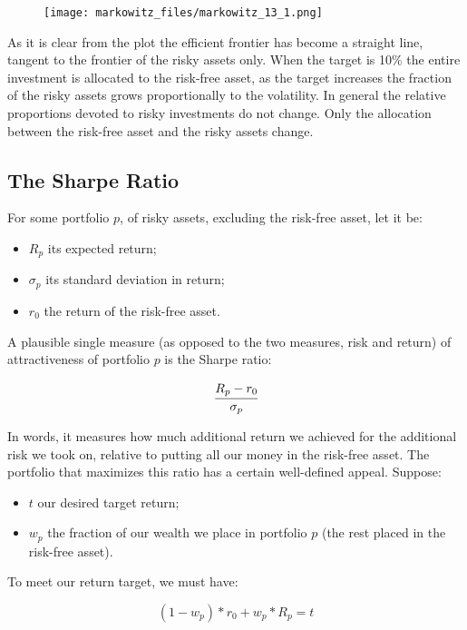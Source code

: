 \begin{figure}
\centering
    \texttt{[image: markowitz\_files/markowitz\_13\_1.png]}
    \end{figure}
    
    As it is clear from the plot the efficient frontier has become a
straight line, tangent to the frontier of the risky assets only. When
the target is 10\% the entire investment is allocated to the risk-free
asset, as the target increases the fraction of the risky assets grows
proportionally to the volatility. In general the relative proportions
devoted to risky investments do not change. Only the allocation between
the risk-free asset and the risky assets change.

\subsection{The Sharpe Ratio}\label{the-sharpe-ratio}

For some portfolio \(p\), of risky assets, excluding the risk-free
asset, let it be:

\begin{itemize}
\tightlist
\item
  \(R_p\) its expected return;
\item
  \(\sigma_p\) its standard deviation in return;
\item
  \(r_0\) the return of the risk-free asset.
\end{itemize}

A plausible single measure (as opposed to the two measures, risk and
return) of attractiveness of portfolio \(p\) is the Sharpe ratio:

\[ \cfrac{R_p - r_0}{\sigma_p} \]

In words, it measures how much additional return we achieved for the
additional risk we took on, relative to putting all our money in the
risk-free asset. The portfolio that maximizes this ratio has a certain
well-defined appeal. Suppose:

\begin{itemize}
\tightlist
\item
  \(t\) our desired target return;
\item
  \(w_p\) the fraction of our wealth we place in portfolio \(p\) (the
  rest placed in the risk-free asset).
\end{itemize}

To meet our return target, we must have:

\[ (1 - w_p) * r_0 + w_p * R_p = t \]

